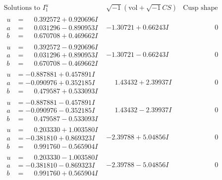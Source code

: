 \documentclass[1p]{elsarticle_modified}
\theoremstyle{definition}
\newcommand{\I}{\sqrt{-1}}
\begin{document}
$$\begin{array}{c|c|c}  
\text{Solutions to }I^u_{1}& \I (\text{vol} + \sqrt{-1}CS) & \text{Cusp shape}\\
 \hline 
\begin{aligned}
u &= \phantom{-}0.392572 + 0.920696 I \\
a &= \phantom{-}0.031296 - 0.890953 I \\
b &= \phantom{-}0.670708 + 0.469662 I\end{aligned}
 & -1.30721 + 0.66243 I & \phantom{-0.000000 } 0 \\ \hline\begin{aligned}
u &= \phantom{-}0.392572 - 0.920696 I \\
a &= \phantom{-}0.031296 + 0.890953 I \\
b &= \phantom{-}0.670708 - 0.469662 I\end{aligned}
 & -1.30721 - 0.66243 I & \phantom{-0.000000 } 0 \\ \hline\begin{aligned}
u &= -0.887881 + 0.457891 I \\
a &= -0.090976 + 0.352185 I \\
b &= \phantom{-}0.479587 + 0.533093 I\end{aligned}
 & \phantom{-}1.43432 + 2.39937 I & \phantom{-0.000000 } 0 \\ \hline\begin{aligned}
u &= -0.887881 - 0.457891 I \\
a &= -0.090976 - 0.352185 I \\
b &= \phantom{-}0.479587 - 0.533093 I\end{aligned}
 & \phantom{-}1.43432 - 2.39937 I & \phantom{-0.000000 } 0 \\ \hline\begin{aligned}
u &= \phantom{-}0.203330 + 1.003580 I \\
a &= -0.381810 + 0.869323 I \\
b &= \phantom{-}0.991760 - 0.565904 I\end{aligned}
 & -2.39788 + 5.04856 I & \phantom{-0.000000 } 0 \\ \hline\begin{aligned}
u &= \phantom{-}0.203330 - 1.003580 I \\
a &= -0.381810 - 0.869323 I \\
b &= \phantom{-}0.991760 + 0.565904 I\end{aligned}
 & -2.39788 - 5.04856 I & \phantom{-0.000000 } 0 \\ \hline\begin{aligned}

\end{aligned}
\end{array}$$
\end{document}
